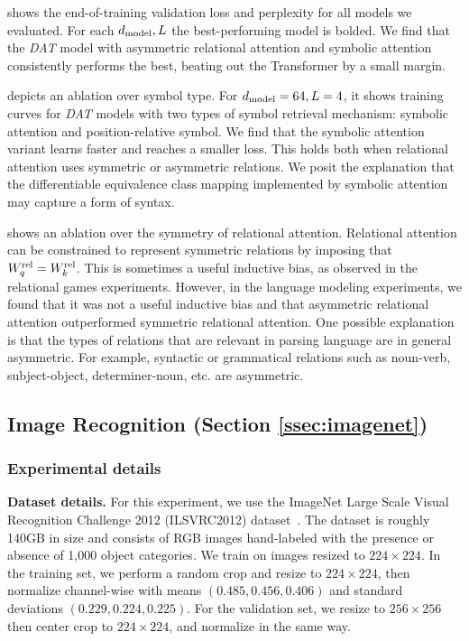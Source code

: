 shows the end-of-training validation loss and perplexity for all models we evaluated. For each $d_{\mathrm{model}}, L$ the best-performing model is bolded. We find that the \textit{DAT} model with asymmetric relational attention and symbolic attention consistently performs the best, beating out the Transformer by a small margin.

 depicts an ablation over symbol type. For $d_{\mathrm{model}} = 64, L = 4$, it shows training curves for \textit{DAT} models with two types of symbol retrieval mechanism: symbolic attention and position-relative symbol. We find that the symbolic attention variant learns faster and reaches a smaller loss. This holds both when relational attention uses symmetric or asymmetric relations. We posit the explanation that the differentiable equivalence class mapping implemented by symbolic attention may capture a form of syntax.

 shows an ablation over the symmetry of relational attention. Relational attention can be constrained to represent symmetric relations by imposing that $W_q^{\mathrm{rel}} = W_k^{\mathrm{rel}}$. This is sometimes a useful inductive bias, as observed in the relational games experiments. However, in the language modeling experiments, we found that it was not a useful inductive bias and that asymmetric relational attention outperformed symmetric relational attention. One possible explanation is that the types of relations that are relevant in parsing language are in general asymmetric. For example, syntactic or grammatical relations such as noun-verb, subject-object, determiner-noun, etc. are asymmetric.

\subsection{Image Recognition (Section \ref{ssec:imagenet})}

\subsubsection*{Experimental details}

\textbf{Dataset details.} For this experiment, we use the ImageNet Large Scale Visual Recognition Challenge 2012 (ILSVRC2012) dataset~\citep{imagenet}. The dataset is roughly 140GB in size and consists of RGB images hand-labeled with the presence or absence of 1,000 object categories. We train on images resized to $224 \times 224$. In the training set, we perform a random crop and resize to $224 \times 224$, then normalize channel-wise with means $(0.485, 0.456, 0.406)$ and standard deviations $(0.229, 0.224, 0.225)$. For the validation set, we resize to $256 \times 256$ then center crop to $224 \times 224$, and normalize in the same way.

